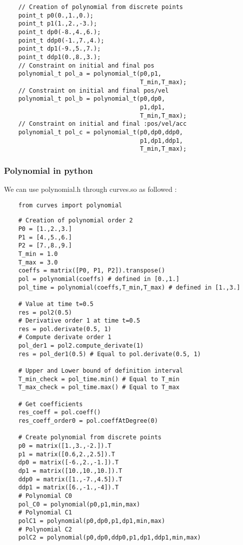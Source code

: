 \documentclass{article}
\begin{document}
\begin{lstlisting}
    // Creation of polynomial from discrete points
    point_t p0(0.,1.,0.);
    point_t p1(1.,2.,-3.);
    point_t dp0(-8.,4.,6.);
    point_t ddp0(-1.,7.,4.);
    point_t dp1(-9.,5.,7.);
    point_t ddp1(0.,8.,3.);
    // Constraint on initial and final pos
    polynomial_t pol_a = polynomial_t(p0,p1,
                                      T_min,T_max);
    // Constraint on initial and final pos/vel
    polynomial_t pol_b = polynomial_t(p0,dp0,
                                      p1,dp1,
                                      T_min,T_max);
    // Constraint on initial and final :pos/vel/acc
    polynomial_t pol_c = polynomial_t(p0,dp0,ddp0,
                                      p1,dp1,ddp1,
                                      T_min,T_max);
    \end{lstlisting}

    \subsubsection{Polynomial in python}
        We can use polynomial.h through curves.so as followed :
    \begin{lstlisting}
    from curves import polynomial
    \end{lstlisting}
    \begin{lstlisting}
    # Creation of polynomial order 2
    P0 = [1.,2.,3.]
    P1 = [4.,5.,6.]
    P2 = [7.,8.,9.]
    T_min = 1.0
    T_max = 3.0
    coeffs = matrix([P0, P1, P2]).transpose()
    pol = polynomial(coeffs) # defined in [0.,1.]
    pol_time = polynomial(coeffs,T_min,T_max) # defined in [1.,3.]

    # Value at time t=0.5
    res = pol2(0.5)
    # Derivative order 1 at time t=0.5
    res = pol.derivate(0.5, 1)
    # Compute derivate order 1
    pol_der1 = pol2.compute_derivate(1)
    res = pol_der1(0.5) # Equal to pol.derivate(0.5, 1)

    # Upper and Lower bound of definition interval
    T_min_check = pol_time.min() # Equal to T_min
    T_max_check = pol_time.max() # Equal to T_max

    # Get coefficients
    res_coeff = pol.coeff()
    res_coeff_order0 = pol.coeffAtDegree(0)

    # Create polynomial from discrete points
    p0 = matrix([1.,3.,-2.]).T
    p1 = matrix([0.6,2.,2.5]).T
    dp0 = matrix([-6.,2.,-1.]).T
    dp1 = matrix([10.,10.,10.]).T
    ddp0 = matrix([1.,-7.,4.5]).T
    ddp1 = matrix([6.,-1.,-4]).T
    # Polynomial C0
    pol_C0 = polynomial(p0,p1,min,max)
    # Polynomial C1
    polC1 = polynomial(p0,dp0,p1,dp1,min,max)
    # Polynomial C2
    polC2 = polynomial(p0,dp0,ddp0,p1,dp1,ddp1,min,max)
    \end{lstlisting}
\end{document}
